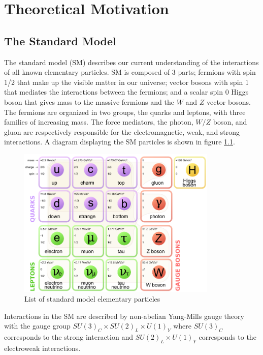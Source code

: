 
\chapter{Theoretical Motivation}
\label{chap:motivation}
\section{The Standard Model}

\indent  The standard model (SM) describes our current understanding of the interactions of all known elementary particles.  SM is composed of 3 parts; fermions with spin 1/2 that make up the visible matter in our universe; vector bosons with spin 1 that mediates the interactions between the fermions; and a scalar spin 0 Higgs boson that gives mass to the massive fermions and the $W$ and $Z$ vector bosons.  The fermions are organized in two groups, the quarks and leptons, with three families of increasing mass.  The force mediators, the photon, $W/Z$ boson, and gluon are respectively responsible for the electromagnetic, weak, and strong interactions.  A diagram displaying the SM particles is shown in figure \ref{fig:SM:part}. \\

\begin{figure}[h!]
	\begin{center}
		\includegraphics[width=0.85\textwidth]{figures/theory/Standard_Model_of_Elementary_Particles.png}
		\caption{List of standard model elementary particles}
		\label{fig:SM:part}
	\end{center}
\end{figure}

\indent  Interactions in the SM are described by non-abelian Yang-Mills gauge theory with the gauge group $SU(3)_C \times SU(2)_L \times U(1)_Y$ where $SU(3)_C$ corresponds to the strong interaction and $SU(2)_L \times U(1)_Y$ corresponds to the electroweak interactions. 

